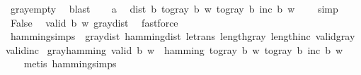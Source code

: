 \begin{isabellebody}
\ gray{\isacharunderscore}{\kern0pt}empty\ \isamarkupfalse%
\ blast\isanewline
\ \ \isamarkupfalse%
\ a\ \isamarkupfalse%
\ {\isachardoublequoteopen}dist\ b\ {\isacharparenleft}{\kern0pt}to{\isacharunderscore}{\kern0pt}gray\ b\ w{\isacharparenright}{\kern0pt}\ {\isacharparenleft}{\kern0pt}to{\isacharunderscore}{\kern0pt}gray\ b\ {\isacharparenleft}{\kern0pt}inc\ b\ w{\isacharparenright}{\kern0pt}{\isacharparenright}{\kern0pt}\ {\isachargreater}{\kern0pt}\ {}{\isachardoublequoteclose}\ \isamarkupfalse%
\ simp\isanewline
\ \ \isamarkupfalse%
\ {\isachardoublequoteopen}False{\isachardoublequoteclose}\ \isamarkupfalse%
\ {\isacartoucheopen}valid\ b\ w{\isacartoucheclose}\ gray{\isacharunderscore}{\kern0pt}dist\ \isamarkupfalse%
\ fastforce\isanewline
{}\isamarkupfalse%
%
\endisatagproof
{\isafoldproof}%
%
\isadelimproof
\isanewline
%
\endisadelimproof
\isanewline
{}\isamarkupfalse%
\ hamming{\isacharunderscore}{\kern0pt}simps\ {\isacharequal}{\kern0pt}\ gray{\isacharunderscore}{\kern0pt}dist\ hamming{\isacharunderscore}{\kern0pt}dist\ le{\isacharunderscore}{\kern0pt}trans\ length{\isacharunderscore}{\kern0pt}gray\ length{\isacharunderscore}{\kern0pt}inc\ valid{\isacharunderscore}{\kern0pt}gray\ valid{\isacharunderscore}{\kern0pt}inc\isanewline
\isanewline
{}\isamarkupfalse%
\ gray{\isacharunderscore}{\kern0pt}hamming{\isacharcolon}{\kern0pt}\ {\isachardoublequoteopen}valid\ b\ w\ {\isasymLongrightarrow}\ hamming\ {\isacharparenleft}{\kern0pt}to{\isacharunderscore}{\kern0pt}gray\ b\ w{\isacharparenright}{\kern0pt}\ {\isacharparenleft}{\kern0pt}to{\isacharunderscore}{\kern0pt}gray\ b\ {\isacharparenleft}{\kern0pt}inc\ b\ w{\isacharparenright}{\kern0pt}{\isacharparenright}{\kern0pt}\ {\isasymle}\ {}{\isachardoublequoteclose}\isanewline
%
\isadelimproof
\ \ %
\endisadelimproof
%
\isatagproof
{}\isamarkupfalse%
\ {\isacharparenleft}{\kern0pt}metis\ hamming{\isacharunderscore}{\kern0pt}simps{\isacharparenright}{\kern0pt}%
\endisatagproof
{\isafoldproof}%
%
\isadelimproof
\isanewline
%
\endisadelimproof
%
\isadelimtheory
\isanewline
%
\endisadelimtheory
%
\isatagtheory
{}\isamarkupfalse%
%
\endisatagtheory
{\isafoldtheory}%
%
\isadelimtheory
%
\endisadelimtheory
%
\end{isabellebody}%
\endinput
